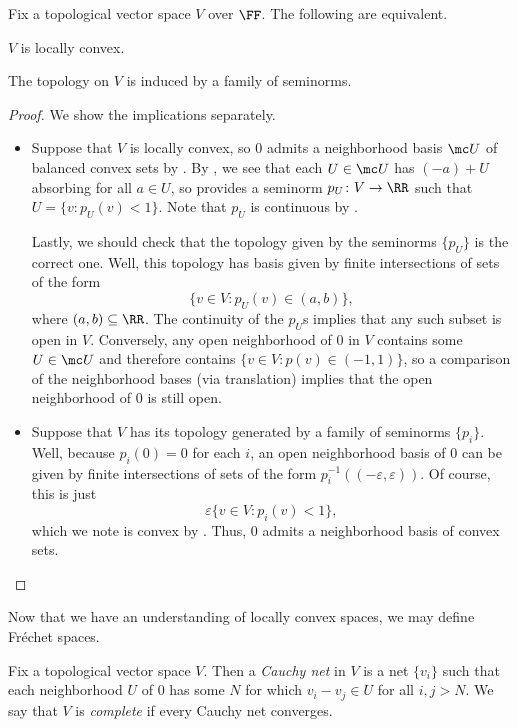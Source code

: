 \documentclass[notes.tex]{subfiles}
\begin{document}
\begin{corollary} \label{cor:locally-convex-by-seminorm}
	Fix a topological vector space $V$ over $\FF$. The following are equivalent.
	\begin{listroman}
		\item $V$ is locally convex.
		\item The topology on $V$ is induced by a family of seminorms.
	\end{listroman}
\end{corollary}
\begin{proof}
	We show the implications separately.
	\begin{itemize}
		\item Suppose that $V$ is locally convex, so $0$ admits a neighborhood basis $\mc U$ of balanced convex sets by . By , we see that each $U\in\mc U$ has $(-a)+U$ absorbing for all $a\in U$, so  provides a seminorm $p_U\colon V\to\RR$ such that $U=\{v:p_U(v)<1\}$. Note that $p_U$ is continuous by .

		Lastly, we should check that the topology given by the seminorms $\{p_U\}$ is the correct one. Well, this topology has basis given by finite intersections of sets of the form
		\[\{v\in V:p_U(v)\in(a,b)\},\]
		where $(a,b)\subseteq\RR$. The continuity of the $p_U$s implies that any such subset is open in $V$. Conversely, any open neighborhood of $0$ in $V$ contains some $U\in\mc U$ and therefore contains $\{v\in V:p(v)\in(-1,1)\}$, so a comparison of the neighborhood bases (via translation) implies that the open neighborhood of $0$ is still open.

		\item Suppose that $V$ has its topology generated by a family of seminorms $\{p_i\}$. Well, because $p_i(0)=0$ for each $i$, an open neighborhood basis of $0$ can be given by finite intersections of sets of the form $p_i^{-1}((-\varepsilon,\varepsilon))$. Of course, this is just
		\[\varepsilon\{v\in V:p_i(v)<1\},\]
		which we note is convex by . Thus, $0$ admits a neighborhood basis of convex sets.
		\qedhere
	\end{itemize}
\end{proof}
Now that we have an understanding of locally convex spaces, we may define Fr\'echet spaces.
\begin{definition}[complete]
	Fix a topological vector space $V$. Then a \textit{Cauchy net} in $V$ is a net $\{v_i\}$ such that each neighborhood $U$ of $0$ has some $N$ for which $v_i-v_j\in U$ for all $i,j>N$. We say that $V$ is \textit{complete} if every Cauchy net converges.
\end{definition}
\end{document}
